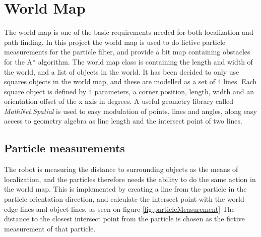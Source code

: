 
\section{World Map}
\label{sec:worldMap}

The world map is one of the basic requirements needed for both localization and path finding.
In this project the world map is used to do fictive particle measurements for the particle filter, and provide a bit map containing obstacles for the A* algorithm.
The world map class is containing the length and width of the world, and a list of objects in the world.
It has been decided to only use squares objects in the world map, and these are modelled as a set of 4 lines.
Each square object is defined by 4 parameters, a corner position, length, width and an orientation offset of the x axis in degrees.
A useful geometry library called \emph{MathNet.Spatial} is used to easy modulation of points, lines and angles, along easy access to geometry algebra as line length and the intersect point of two lines.

\subsection{Particle measurements}

The robot is measuring the distance to surrounding objects as the means of localization, and the particles therefore needs the ability to do the same action in the world map.
This is implemented by creating a line from the particle in the particle orientation direction, and calculate the intersect point with the world edge lines and object lines, as seen on figure \ref{fig:particleMeasurement}
The distance to the closest intersect point from the particle is chosen as the fictive measurement of that particle.


\pagebreak